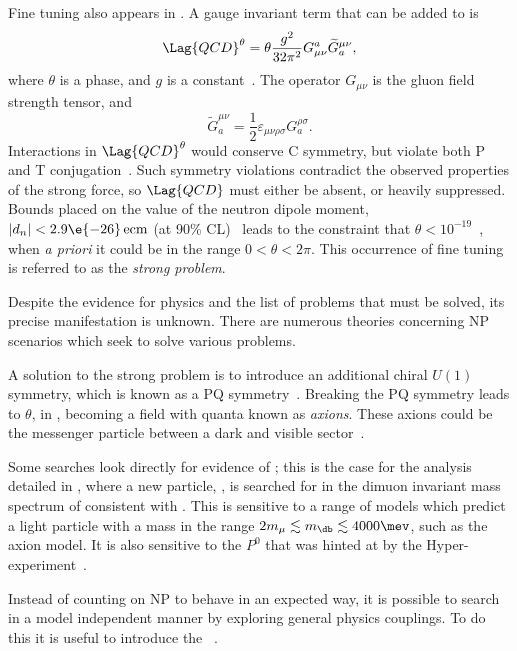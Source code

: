 Fine tuning also appears in \QCD.
A gauge invariant term that can be added to  is
\begin{equation}
  \Lag{QCD}^\theta = \theta\frac{g^2}{32\pi^2}
  G_{\mu\nu}^a\widetilde G^{\mu\nu}_a,
  \label{eq:strongcp}
\end{equation}
where $\theta$ is a phase, and $g$ is a constant~\cite{Peccei:2006as}.
The operator $G_{\mu\nu}$ is the gluon field strength tensor, and
\begin{equation}
  \widetilde G^{\mu\nu}_a = \frac12\varepsilon_{\mu\nu\rho\sigma}G^{\rho\sigma}_a.
\end{equation}
Interactions in $\Lag{QCD}^\theta$ would conserve \gls{C} symmetry, but violate both \gls{P} and
\gls{T} conjugation~\cite{Peccei:2006as}.
Such symmetry violations contradict the observed properties of the strong
force, so $\Lag{QCD}$ must either be absent, or heavily suppressed.
Bounds placed on the value of the neutron dipole moment, $|d_n| <2.9\e{-26}\,\mathrm{ecm}$
(at 90\% CL)~\cite{Baker:2006ts} leads to the constraint that
$\theta<10^{-19}$~\cite{Crewther:PQref9}, when \emph{a priori} it could be in the range
$0<\theta<2\pi$.
This occurrence of fine tuning is referred to as the \emph{strong \CP problem}.

Despite the evidence for \bsm physics and the list of problems that must be solved, its precise
manifestation is unknown.
There are numerous theories concerning NP scenarios which seek to solve various problems.

A solution to the strong \CP problem is to introduce an additional chiral $U(1)$ symmetry,
which is known as a \gls{PQ} symmetry~\cite{Peccei:2006as}.
Breaking the \gls{PQ} symmetry leads to $\theta$, in , becoming a
field with quanta known as \emph{axions}.
These axions could be the messenger particle between a dark and visible
sector~\cite{Peccei:2006as}.




Some searches look directly for evidence of \np; this is the case for the analysis detailed in
, where a new particle, \db, is searched for in the dimuon invariant mass spectrum of
\decay{\Bd}{\Kstarent\mumu} consistent with \decay{\db}{\mumu}.
This is sensitive to a range of models which predict a light particle with a mass in the range
$2m_\mu\lesssim m_\db\lesssim4000\mev$, such as the axion model.
It is also sensitive to the $P^0$ that was hinted at by the Hyper-\CP
experiment~\cite{Park:2005eka}.

Instead of counting on NP to behave in an expected way, it is possible to search in a model
independent manner by exploring general physics couplings.
To do this it is useful to introduce the \OPE~\cite{PhysRev.179.1499}.


